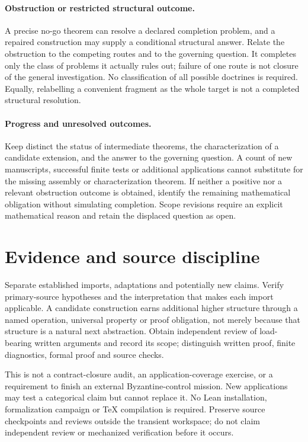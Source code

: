 \documentclass[11pt]{article}
\begin{document}
\paragraph{Obstruction or restricted structural outcome.}
A precise no-go theorem can resolve a declared completion problem, and a repaired construction may supply a conditional structural answer. Relate the obstruction to the competing routes and to the governing question. It completes only the class of problems it actually rules out; failure of one route is not closure of the general investigation. No classification of all possible doctrines is required. Equally, relabelling a convenient fragment as the whole target is not a completed structural resolution.

\paragraph{Progress and unresolved outcomes.}
Keep distinct the status of intermediate theorems, the characterization of a candidate extension, and the answer to the governing question. A count of new manuscripts, successful finite tests or additional applications cannot substitute for the missing assembly or characterization theorem. If neither a positive nor a relevant obstruction outcome is obtained, identify the remaining mathematical obligation without simulating completion. Scope revisions require an explicit mathematical reason and retain the displaced question as open.

\section{Evidence and source discipline}
Separate established imports, adaptations and potentially new claims. Verify primary-source hypotheses and the interpretation that makes each import applicable. A candidate construction earns additional higher structure through a named operation, universal property or proof obligation, not merely because that structure is a natural next abstraction. Obtain independent review of load-bearing written arguments and record its scope; distinguish written proof, finite diagnostics, formal proof and source checks.

This is not a contract-closure audit, an application-coverage exercise, or a requirement to finish an external Byzantine-control mission. New applications may test a categorical claim but cannot replace it. No Lean installation, formalization campaign or TeX compilation is required. Preserve source checkpoints and reviews outside the transient workspace; do not claim independent review or mechanized verification before it occurs.
\end{document}
